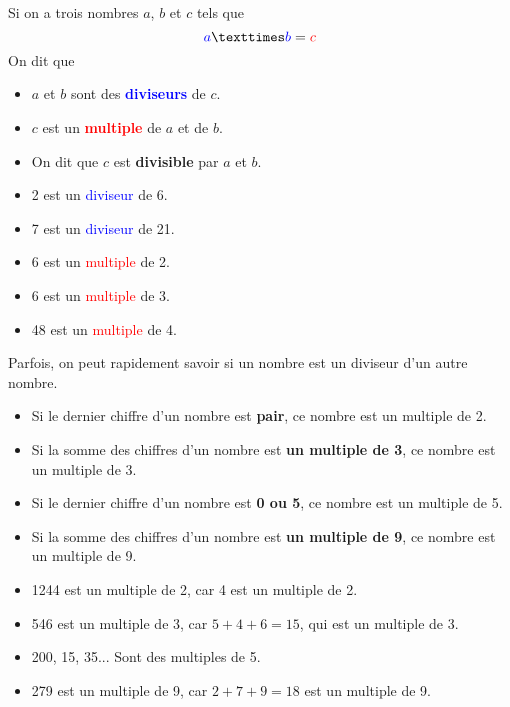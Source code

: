 \documentclass[../€Cours-complet/Cours-complet]{subfiles}
\begin{document}
\maketitleCours

\begin{cours}
	Si on a trois nombres $a$, $b$ et $c$ tels que
	$$ \textcolor{blue}{a} × \textcolor{blue}{b} = \textcolor{red}{c} $$
	On dit que
	\begin{itemize}
		\setlength\itemsep{0.3em}
		\item $a$ et $b$ sont des \textcolor{blue}{\textbf{diviseurs}} de $c$.
		\item $c$ est un \textcolor{red}{\textbf{multiple}} de $a$ et de $b$.
		\item On dit que $c$ est \textbf{divisible} par $a$ et $b$.
	\end{itemize}
\end{cours}

\begin{exemple}
	\begin{itemize}
		\setlength\itemsep{0.3em}
		\item 2 est un \textcolor{blue}{diviseur} de 6.
		\item 7 est un \textcolor{blue}{diviseur} de 21.
		\item 6 est un \textcolor{red}{multiple} de 2.
		\item 6 est un \textcolor{red}{multiple} de 3.
		\item 48 est un \textcolor{red}{multiple} de 4.
	\end{itemize}
\end{exemple}

\begin{cours} \label{cours:criteres-de-divisibilite}
	Parfois, on peut rapidement savoir si un nombre est un diviseur d'un autre nombre. \\
	\begin{itemize}
		\setlength\itemsep{0.3em}
		\item Si le dernier chiffre d'un nombre est \textbf{pair}, ce nombre est un multiple de 2.
		\item Si la somme des chiffres d'un nombre est \textbf{un multiple de 3}, ce nombre est un multiple de 3.
		\item Si le dernier chiffre d'un nombre est \textbf{0 ou 5}, ce nombre est un multiple de 5.
		\item Si la somme des chiffres d'un nombre est \textbf{un multiple de 9}, ce nombre est un multiple de 9.
	\end{itemize}
\end{cours}

\begin{exemple}
	\begin{itemize}
		\setlength\itemsep{0.3em}
		\item 1244 est un multiple de 2, car 4 est un multiple de 2.
		\item 546 est un multiple de 3, car $5 + 4 + 6 = 15$, qui est un multiple de 3.
		\item 200, 15, 35... Sont des multiples de 5.
		\item 279 est un multiple de 9, car $2 + 7 + 9 = 18$ est un multiple de 9.
	\end{itemize}
\end{exemple}
\end{document}
